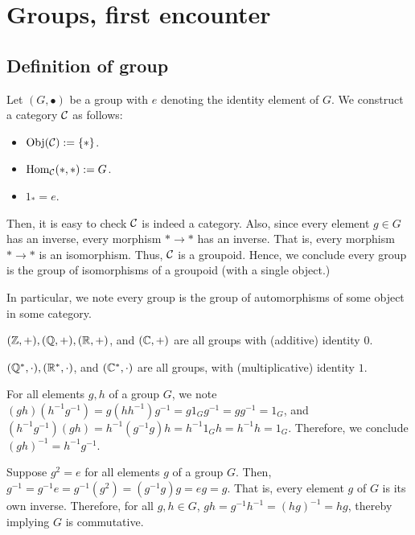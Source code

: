 \chapter{Groups, first encounter}

\section{Definition of group}
\begin{xca}
Let $(G, \bullet)$ be a group with $e$ denoting the identity element of $G$. We
construct a category $\mathcal{C}$ as follows:
\begin{itemize}
    \item $\operatorname{Obj}(\mathcal{C}) := \{ \ast \}$.
    \item $\operatorname{Hom}_{\mathcal{C}}(\ast, \ast) := G$.
    \item $1_{\ast} = e$.
\end{itemize}
Then, it is easy to check $\mathcal{C}$ is indeed a category. Also, since every
element $g \in G$ has an inverse, every morphism $\ast \to \ast$ has an inverse.
That is, every morphism $\ast \to \ast$ is an isomorphism. Thus, $\mathcal{C}$ is a
groupoid. Hence, we conclude every group is the group of isomorphisms of a
groupoid (with a single object.)

In particular, we note every group is the group of automorphisms of some object
in some category.
\end{xca}

\begin{xca}
$(\mathbb{Z}, +), (\mathbb{Q}, +), (\mathbb{R}, +)$, and $(\mathbb{C}, +)$ are all groups with (additive)
identity $0$.

$(\mathbb{Q}^*, \cdot), (\mathbb{R}^*, \cdot)$, and $(\mathbb{C}^*, \cdot)$ are all groups, with
(multiplicative) identity $1$.
\end{xca}

\begin{xca}
For all elements $g, h$ of a group $G$, we note $(gh)(h^{-1} g^{-1}) =
g(h h^{-1})g^{-1} = g 1_G g^{-1} = g g^{-1} = 1_G$, and $(h^{-1} g^{-1})(gh) =
h^{-1}(g^{-1}g)h = h^{-1} 1_G h = h^{-1} h = 1_G$. Therefore, we conclude
$(gh)^{-1} = h^{-1} g^{-1}$.
\end{xca}

\begin{xca}
Suppose $g^2 = e$ for all elements $g$ of a group $G$. Then, $g^{-1} = g^{-1} e
= g^{-1}(g^2) = (g^{-1} g) g = e g = g$. That is, every element $g$ of $G$ is
its own inverse. Therefore, for all $g, h \in G$, $gh = g^{-1} h^{-1} =
(hg)^{-1} = hg$, thereby implying $G$ is commutative.
\end{xca}


